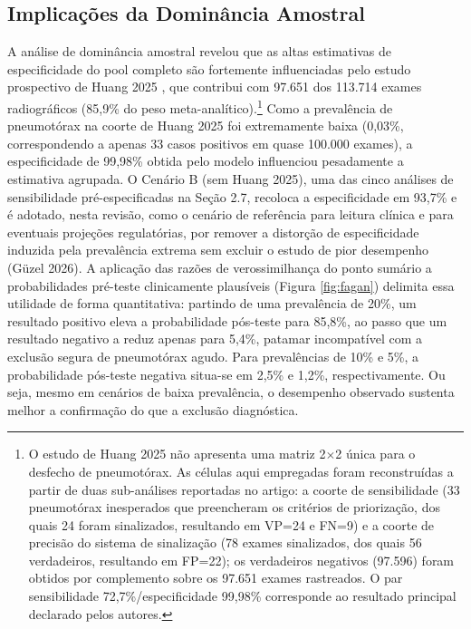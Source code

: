 \documentclass[12pt,a4paper]{article}
\begin{document}
\subsection{Implicações da Dominância Amostral}
A análise de dominância amostral revelou que as altas estimativas de especificidade do pool completo são fortemente influenciadas pelo estudo prospectivo de Huang 2025 \cite{huang2025}, que contribui com 97.651 dos 113.714 exames radiográficos (85,9\% do peso meta-analítico).\footnote{O estudo de Huang 2025 não apresenta uma matriz 2$\times$2 única para o desfecho de pneumotórax. As células aqui empregadas foram reconstruídas a partir de duas sub-análises reportadas no artigo: a coorte de sensibilidade (33 pneumotórax inesperados que preencheram os critérios de priorização, dos quais 24 foram sinalizados, resultando em VP=24 e FN=9) e a coorte de precisão do sistema de sinalização (78 exames sinalizados, dos quais 56 verdadeiros, resultando em FP=22); os verdadeiros negativos (97.596) foram obtidos por complemento sobre os 97.651 exames rastreados. O par sensibilidade 72,7\%/especificidade 99,98\% corresponde ao resultado principal declarado pelos autores.} Como a prevalência de pneumotórax na coorte de Huang 2025 foi extremamente baixa (0,03\%, correspondendo a apenas 33 casos positivos em quase 100.000 exames), a especificidade de 99,98\% obtida pelo modelo influenciou pesadamente a estimativa agrupada. O Cenário B (sem Huang 2025), uma das cinco análises de sensibilidade pré-especificadas na Seção 2.7, recoloca a especificidade em 93,7\% e é adotado, nesta revisão, como o cenário de referência para leitura clínica e para eventuais projeções regulatórias, por remover a distorção de especificidade induzida pela prevalência extrema sem excluir o estudo de pior desempenho (Güzel 2026). A aplicação das razões de verossimilhança do ponto sumário a probabilidades pré-teste clinicamente plausíveis (Figura \ref{fig:fagan}) delimita essa utilidade de forma quantitativa: partindo de uma prevalência de 20\%, um resultado positivo eleva a probabilidade pós-teste para 85,8\%, ao passo que um resultado negativo a reduz apenas para 5,4\%, patamar incompatível com a exclusão segura de pneumotórax agudo. Para prevalências de 10\% e 5\%, a probabilidade pós-teste negativa situa-se em 2,5\% e 1,2\%, respectivamente. Ou seja, mesmo em cenários de baixa prevalência, o desempenho observado sustenta melhor a confirmação do que a exclusão diagnóstica.
\end{document}
